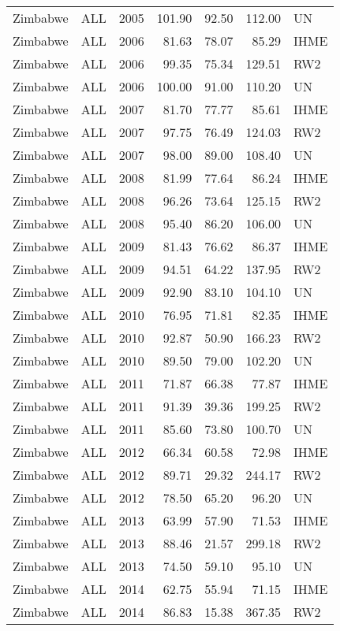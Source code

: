\begin{longtable}{lllrrrl}
  Zimbabwe & ALL & 2005 & 101.90 & 92.50 & 112.00 & UN \\ 
  Zimbabwe & ALL & 2006 & 81.63 & 78.07 & 85.29 & IHME \\ 
  Zimbabwe & ALL & 2006 & 99.35 & 75.34 & 129.51 & RW2 \\ 
  Zimbabwe & ALL & 2006 & 100.00 & 91.00 & 110.20 & UN \\ 
  Zimbabwe & ALL & 2007 & 81.70 & 77.77 & 85.61 & IHME \\ 
  Zimbabwe & ALL & 2007 & 97.75 & 76.49 & 124.03 & RW2 \\ 
  Zimbabwe & ALL & 2007 & 98.00 & 89.00 & 108.40 & UN \\ 
  Zimbabwe & ALL & 2008 & 81.99 & 77.64 & 86.24 & IHME \\ 
  Zimbabwe & ALL & 2008 & 96.26 & 73.64 & 125.15 & RW2 \\ 
  Zimbabwe & ALL & 2008 & 95.40 & 86.20 & 106.00 & UN \\ 
  Zimbabwe & ALL & 2009 & 81.43 & 76.62 & 86.37 & IHME \\ 
  Zimbabwe & ALL & 2009 & 94.51 & 64.22 & 137.95 & RW2 \\ 
  Zimbabwe & ALL & 2009 & 92.90 & 83.10 & 104.10 & UN \\ 
  Zimbabwe & ALL & 2010 & 76.95 & 71.81 & 82.35 & IHME \\ 
  Zimbabwe & ALL & 2010 & 92.87 & 50.90 & 166.23 & RW2 \\ 
  Zimbabwe & ALL & 2010 & 89.50 & 79.00 & 102.20 & UN \\ 
  Zimbabwe & ALL & 2011 & 71.87 & 66.38 & 77.87 & IHME \\ 
  Zimbabwe & ALL & 2011 & 91.39 & 39.36 & 199.25 & RW2 \\ 
  Zimbabwe & ALL & 2011 & 85.60 & 73.80 & 100.70 & UN \\ 
  Zimbabwe & ALL & 2012 & 66.34 & 60.58 & 72.98 & IHME \\ 
  Zimbabwe & ALL & 2012 & 89.71 & 29.32 & 244.17 & RW2 \\ 
  Zimbabwe & ALL & 2012 & 78.50 & 65.20 & 96.20 & UN \\ 
  Zimbabwe & ALL & 2013 & 63.99 & 57.90 & 71.53 & IHME \\ 
  Zimbabwe & ALL & 2013 & 88.46 & 21.57 & 299.18 & RW2 \\ 
  Zimbabwe & ALL & 2013 & 74.50 & 59.10 & 95.10 & UN \\ 
  Zimbabwe & ALL & 2014 & 62.75 & 55.94 & 71.15 & IHME \\ 
  Zimbabwe & ALL & 2014 & 86.83 & 15.38 & 367.35 & RW2 \\ 

\end{longtable}
